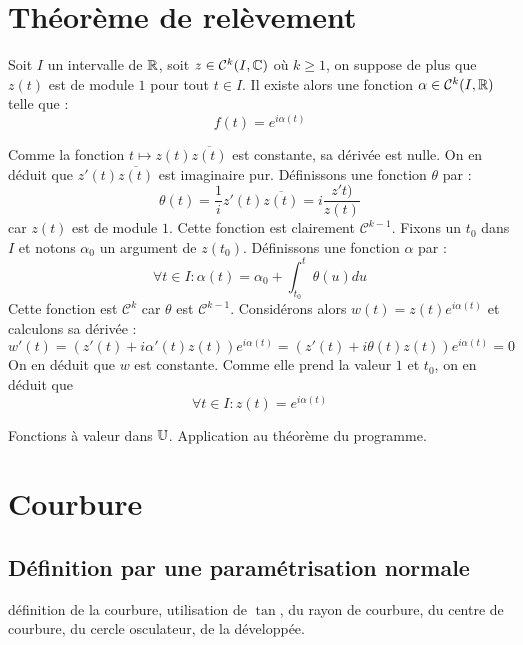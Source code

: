 \section{Théorème de relèvement}
\begin{prop}
 Soit $I$ un intervalle de $\mathbb{R}$, soit $z\in \mathcal C^k(I,\mathbb{C})$ où $k\geq 1$, on suppose de plus que $z(t)$ est de module $1$ pour tout $t\in I$. Il existe alors une fonction $\alpha \in \mathcal C^{k}(I,\mathbb{R})$ telle que :
\begin{displaymath}
 f(t)=e^{i\alpha(t)}
\end{displaymath}
\end{prop}
\begin{demo}
 Comme la fonction $t\mapsto z(t)\overline{z(t)}$ est constante, sa dérivée est nulle. On en déduit que $z'(t)\overline{z(t)}$ est imaginaire pur. Définissons une fonction $\theta$ par :
\begin{displaymath}
 \theta(t) = \dfrac{1}{i}z'(t)\overline{z(t)} = i\frac{z't)}{z(t)}
\end{displaymath}
car $z(t)$ est de module $1$. Cette fonction est clairement $\mathcal C^{k-1}$. Fixons un $t_0$ dans $I$ et notons $\alpha_0$ un argument de $z(t_0)$. Définissons une fonction $\alpha$ par :
\begin{displaymath}
 \forall t\in I : \alpha(t) = \alpha_0 + \int_{t_0}^{t}\theta(u)du
\end{displaymath}
Cette fonction est $\mathcal C^k$ car $\theta$ est $\mathcal C^{k-1}$. Considérons alors $w(t)=z(t)e^{i\alpha(t)}$ et calculons sa dérivée :
\begin{displaymath}
 w'(t) = (z'(t)+i\alpha'(t)z(t))e^{i\alpha(t)}=(z'(t)+i\theta(t)z(t))e^{i\alpha(t)}=0
\end{displaymath}
On en déduit que $w$ est constante. Comme elle prend la valeur $1$ et $t_0$, on en déduit que
\begin{displaymath}
 \forall t\in I : z(t) = e^{i\alpha(t)}
\end{displaymath}

\end{demo}

Fonctions à valeur dans $\mathbb{U}$. Application au théorème du programme.

\section{Courbure}
\subsection{Définition par une paramétrisation normale}
définition de la courbure, utilisation de $\tan$,  du rayon de courbure, du centre de courbure, du cercle osculateur, de la développée.
